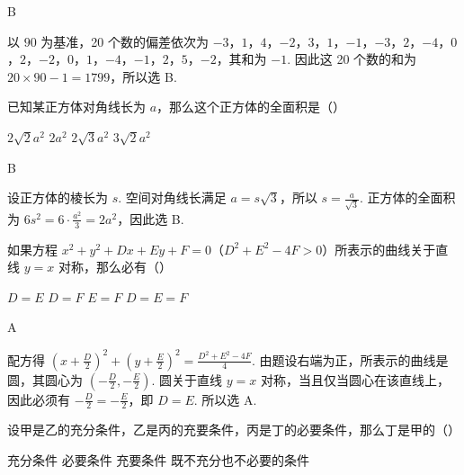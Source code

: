 \begin{answer}
B
\end{answer}

\begin{solution}
以 \(90\) 为基准，20 个数的偏差依次为 \(-3\)，\(1\)，\(4\)，\(-2\)，\(3\)，\(1\)，\(-1\)，\(-3\)，\(2\)，\(-4\)，\(0\)，\(2\)，\(-2\)，\(0\)，\(1\)，\(-4\)，\(-1\)，\(2\)，\(5\)，\(-2\)，其和为 \(-1\). 因此这 20 个数的和为 \(20\times90-1=1799\)，所以选 B.
\end{solution}

\begin{problem}
已知某正方体对角线长为 \(a\)，那么这个正方体的全面积是（\quad）

\choices
    {\(2\sqrt{2}a^2\)}
    {\(2a^2\)}
    {\(2\sqrt{3}a^2\)}
    {\(3\sqrt{2}a^2\)}
\end{problem}

\begin{answer}
B
\end{answer}

\begin{solution}
设正方体的棱长为 \(s\). 空间对角线长满足 \(a=s\sqrt{3}\)，所以 \(s=\frac{a}{\sqrt{3}}\). 正方体的全面积为 \(6s^2=6\cdot\frac{a^2}{3}=2a^2\)，因此选 B.
\end{solution}

\begin{problem}
如果方程 \(x^2 + y^2 + Dx + Ey + F = 0\)（\(D^2 + E^2 - 4F > 0\)）所表示的曲线关于直线 \(y = x\) 对称，那么必有（\quad）

\choices
    {\(D = E\)}
    {\(D = F\)}
    {\(E = F\)}
    {\(D = E = F\)}
\end{problem}

\begin{answer}
A
\end{answer}

\begin{solution}
配方得 \(\left(x+\frac{D}{2}\right)^2+\left(y+\frac{E}{2}\right)^2=\frac{D^2+E^2-4F}{4}\). 由题设右端为正，所表示的曲线是圆，其圆心为 \(\left(-\frac{D}{2},-\frac{E}{2}\right)\). 圆关于直线 \(y=x\) 对称，当且仅当圆心在该直线上，因此必须有 \(-\frac{D}{2}=-\frac{E}{2}\)，即 \(D=E\). 所以选 A.
\end{solution}

\begin{problem}
设甲是乙的充分条件，乙是丙的充要条件，丙是丁的必要条件，那么丁是甲的（\quad）

\choices
    {充分条件}
    {必要条件}
    {充要条件}
    {既不充分也不必要的条件}
\end{problem}

